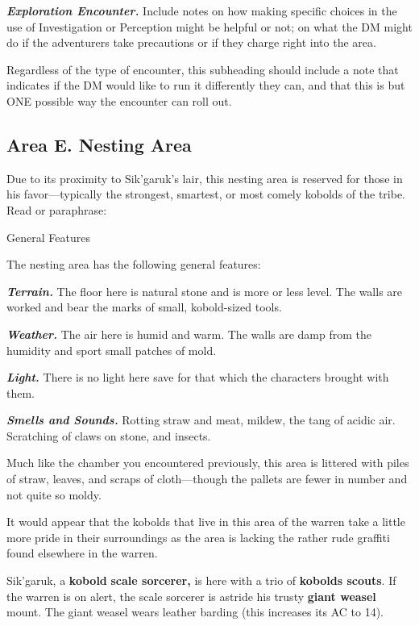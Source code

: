 \emph{\textbf{Exploration Encounter.}} Include notes on how making
specific choices in the use of Investigation or Perception might be
helpful or not; on what the DM might do if the adventurers take
precautions or if they charge right into the area.

Regardless of the type of encounter, this subheading should include a
note that indicates if the DM would like to run it differently they can,
and that this is but ONE possible way the encounter can roll out.

\subsection{Area E. Nesting Area}\label{area-e.-nesting-area}

Due to its proximity to Sik'garuk's lair, this nesting area is reserved
for those in his favor---typically the strongest, smartest, or most
comely kobolds of the tribe. Read or paraphrase:

General Features

The nesting area has the following general features:

\emph{\textbf{Terrain.}} The floor here is natural stone and is more or
less level. The walls are worked and bear the marks of small,
kobold-sized tools.

\emph{\textbf{Weather.}} The air here is humid and warm. The walls are
damp from the humidity and sport small patches of mold.

\emph{\textbf{Light.}} There is no light here save for that which the
characters brought with them.

\emph{\textbf{Smells and Sounds.}} Rotting straw and meat, mildew, the
tang of acidic air. Scratching of claws on stone, and insects.

Much like the chamber you encountered previously, this area is littered
with piles of straw, leaves, and scraps of cloth---though the pallets
are fewer in number and not quite so moldy.

It would appear that the kobolds that live in this area of the warren
take a little more pride in their surroundings as the area is lacking
the rather rude graffiti found elsewhere in the warren.

Sik'garuk, a \textbf{kobold} \textbf{scale sorcerer,} is here with a
trio of \textbf{kobolds scouts}. If the warren is on alert, the scale
sorcerer is astride his trusty \textbf{giant weasel} mount. The giant
weasel wears leather barding (this increases its AC to 14).

